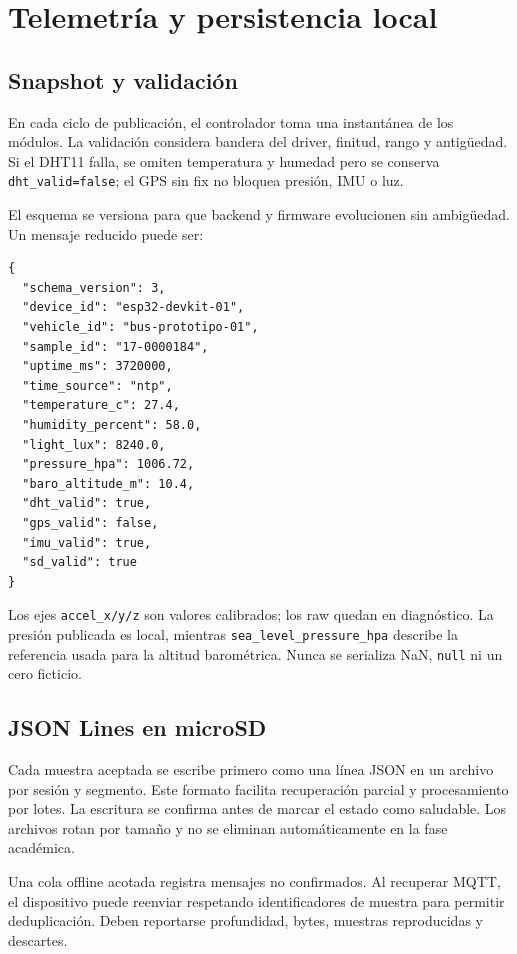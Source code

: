 \documentclass[11pt,a4paper,oneside]{report}
\begin{document}
\chapter{Telemetría y persistencia local}

\section{Snapshot y validación}
En cada ciclo de publicación, el controlador toma una instantánea de los módulos. La
validación considera bandera del driver, finitud, rango y antigüedad. Si el DHT11
falla, se omiten temperatura y humedad pero se conserva \texttt{dht\_valid=false};
el GPS sin fix no bloquea presión, IMU o luz.

El esquema se versiona para que backend y firmware evolucionen sin ambigüedad. Un
mensaje reducido puede ser:

\begin{lstlisting}
{
  "schema_version": 3,
  "device_id": "esp32-devkit-01",
  "vehicle_id": "bus-prototipo-01",
  "sample_id": "17-0000184",
  "uptime_ms": 3720000,
  "time_source": "ntp",
  "temperature_c": 27.4,
  "humidity_percent": 58.0,
  "light_lux": 8240.0,
  "pressure_hpa": 1006.72,
  "baro_altitude_m": 10.4,
  "dht_valid": true,
  "gps_valid": false,
  "imu_valid": true,
  "sd_valid": true
}
\end{lstlisting}

Los ejes \texttt{accel\_x/y/z} son valores calibrados; los raw quedan en diagnóstico.
La presión publicada es local, mientras \texttt{sea\_level\_pressure\_hpa} describe la
referencia usada para la altitud barométrica. Nunca se serializa NaN, \texttt{null} ni
un cero ficticio.

\section{JSON Lines en microSD}
Cada muestra aceptada se escribe primero como una línea JSON en un archivo por sesión
y segmento. Este formato facilita recuperación parcial y procesamiento por lotes.
La escritura se confirma antes de marcar el estado como saludable. Los archivos rotan
por tamaño y no se eliminan automáticamente en la fase académica.

Una cola offline acotada registra mensajes no confirmados. Al recuperar MQTT, el
dispositivo puede reenviar respetando identificadores de muestra para permitir
deduplicación. Deben reportarse profundidad, bytes, muestras reproducidas y descartes.
\end{document}
